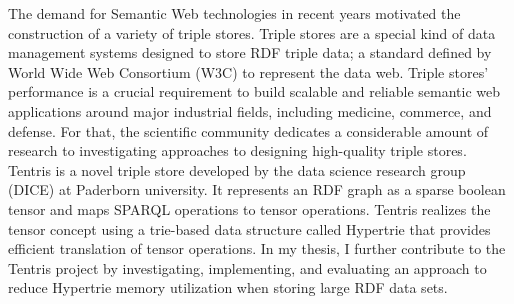 The demand for Semantic Web technologies in recent years motivated the construction of a variety of triple stores.
Triple stores are a special kind of data management systems designed to store RDF triple data; a standard defined by 
World Wide Web Consortium (W3C) to represent the data web. 
Triple stores' performance is a crucial requirement to build scalable and reliable semantic web applications around major industrial fields, including medicine, commerce, and defense. For that, the scientific community dedicates a considerable amount of research to investigating approaches to designing high-quality triple stores. Tentris is a novel triple store developed by the data science research group (DICE) at Paderborn university. It represents an RDF graph as a sparse boolean tensor and maps SPARQL operations to tensor operations. Tentris realizes the tensor concept using a trie-based data structure called Hypertrie that provides efficient translation of tensor operations. In my thesis, I further contribute to the Tentris project by investigating, implementing, and evaluating an approach to reduce Hypertrie memory utilization when storing large RDF data sets.